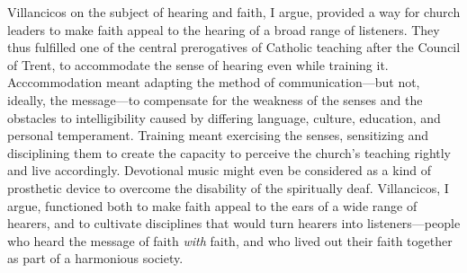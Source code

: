 Villancicos on the subject of hearing and faith, I argue, provided a way for
church leaders to make faith appeal to the hearing of a broad range of
listeners.
They thus fulfilled one of the central prerogatives of Catholic teaching after
the Council of Trent, to accommodate the sense of hearing even while training
it.
Acccommodation meant adapting the method of communication---but not, ideally,
the message---to compensate for the weakness of the senses and the obstacles to
intelligibility caused by differing language, culture, education, and personal
temperament. 
Training meant exercising the senses, sensitizing and disciplining them to
create the capacity to perceive the church's teaching rightly and live
accordingly.
Devotional music might even be considered as a kind of prosthetic device to
overcome the disability of the spiritually deaf.
Villancicos, I argue, functioned both to make faith appeal to the
ears of a wide range of hearers, and to cultivate disciplines that would turn
hearers into listeners---people who heard the message of faith \emph{with}
faith, and who lived out their faith together as part of a harmonious society.

